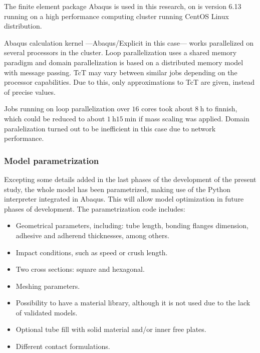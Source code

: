 \documentclass[cmfonts]{witpress}
\begin{document}
The finite element package Abaqus is used in this research, on is version 6.13 \cite{Abaqus613Manual} running on a high performance computing cluster running CentOS Linux distribution.

Abaqus calculation kernel ---Abaqus/Explicit in this case--- works parallelized on several processors in the cluster. Loop parallelization uses a shared memory paradigm and domain parallelization is based on a distributed memory model with message passing. TcT may vary between similar jobs depending on the processor capabilities. Due to this, only approximations to TcT are given, instead of precise values.

Jobs running on loop parallelization over $16$ cores took about $\SI{8}{\hour}$ to finnish, which could be reduced to about $\SI{1}{\hour}$$\SI{15}{\minute}$ if mass scaling was applied. Domain paralelization turned out to be inefficient in this case due to network performance.


\subsubsection{Model parametrization}
\label{sec:script}

Excepting some details added in the last phases of the development of the present study, the whole model has been parametrized, making use of the Python interpreter integrated in Abaqus. This will allow model optimization in future phases of development. The parametrization code includes:

\begin{itemize}
	\item Geometrical parameters, including: tube length, bonding flanges dimension, adhesive and adherend thicknesses, among others.

	\item Impact conditions, such as speed or crush length.

	\item Two cross sections: square and hexagonal.

	\item Meshing parameters.

	\item Possibility to have a material library, although it is not used due to the lack of validated models.

	\item Optional tube fill with solid material and/or inner free plates.

	\item Different contact formulations.
\end{itemize}
\end{document}
